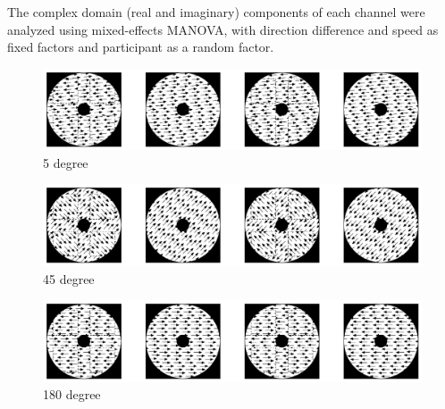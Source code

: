 \documentclass[landscape,final,paperwidth=72in,paperheight=42in,fontscale=0.285]{baposter}
\begin{document}
\begin{poster}
{      The complex domain (real and imaginary) components of each channel were analyzed using mixed-effects MANOVA, with direction difference and speed as fixed factors and participant as a random factor.  
      }
    {
\begin{figure}[H]
  \centering
  \caption{5 degree}\label{mofo-child-tuning-dir5.jpg}
  \includegraphics[scale=0.3]{img/mofo-child-tuning-dir5.jpg}
\end{figure}
\begin{figure}[H]
  \centering
  \caption{45 degree}\label{mofo-child-tuning-dir45.jpg}
  \includegraphics[scale=0.3]{img/mofo-child-tuning-dir45.jpg}
\end{figure}
\begin{figure}[H]
  \centering
  \caption{180 degree}\label{mofo-child-tuning-dir180.jpg}
  \includegraphics[scale=0.3]{img/mofo-child-tuning-dir180.jpg}
\end{figure}      
    }
    {
\begin{demobox}[title=Direction-Speed Interaction]


\end{demobox}}
\end{poster}
\end{document}
